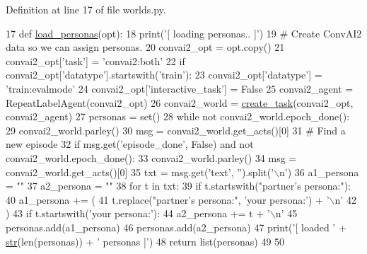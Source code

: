 Definition at line 17 of file worlds.\+py.


\begin{DoxyCode}
17 \textcolor{keyword}{def }\hyperlink{namespaceparlai_1_1tasks_1_1convai2_1_1worlds_a61a758b7cb43183397d002f7f203f586}{load\_personas}(opt):
18     print(\textcolor{stringliteral}{'[ loading personas.. ]'})
19     \textcolor{comment}{# Create ConvAI2 data so we can assign personas.}
20     convai2\_opt = opt.copy()
21     convai2\_opt[\textcolor{stringliteral}{'task'}] = \textcolor{stringliteral}{'convai2:both'}
22     \textcolor{keywordflow}{if} convai2\_opt[\textcolor{stringliteral}{'datatype'}].startswith(\textcolor{stringliteral}{'train'}):
23         convai2\_opt[\textcolor{stringliteral}{'datatype'}] = \textcolor{stringliteral}{'train:evalmode'}
24     convai2\_opt[\textcolor{stringliteral}{'interactive\_task'}] = \textcolor{keyword}{False}
25     convai2\_agent = RepeatLabelAgent(convai2\_opt)
26     convai2\_world = \hyperlink{namespaceparlai_1_1core_1_1worlds_a79969c7ba76d4b3c500f5bb776444dc6}{create\_task}(convai2\_opt, convai2\_agent)
27     personas = set()
28     \textcolor{keywordflow}{while} \textcolor{keywordflow}{not} convai2\_world.epoch\_done():
29         convai2\_world.parley()
30         msg = convai2\_world.get\_acts()[0]
31         \textcolor{comment}{# Find a new episode}
32         \textcolor{keywordflow}{if} msg.get(\textcolor{stringliteral}{'episode\_done'}, \textcolor{keyword}{False}) \textcolor{keywordflow}{and} \textcolor{keywordflow}{not} convai2\_world.epoch\_done():
33             convai2\_world.parley()
34             msg = convai2\_world.get\_acts()[0]
35             txt = msg.get(\textcolor{stringliteral}{'text'}, \textcolor{stringliteral}{''}).split(\textcolor{stringliteral}{'\(\backslash\)n'})
36             a1\_persona = \textcolor{stringliteral}{""}
37             a2\_persona = \textcolor{stringliteral}{""}
38             \textcolor{keywordflow}{for} t \textcolor{keywordflow}{in} txt:
39                 \textcolor{keywordflow}{if} t.startswith(\textcolor{stringliteral}{"partner's persona:"}):
40                     a1\_persona += (
41                         t.replace(\textcolor{stringliteral}{"partner's persona:"}, \textcolor{stringliteral}{'your persona:'}) + \textcolor{stringliteral}{'\(\backslash\)n'}
42                     )
43                 \textcolor{keywordflow}{if} t.startswith(\textcolor{stringliteral}{'your persona:'}):
44                     a2\_persona += t + \textcolor{stringliteral}{'\(\backslash\)n'}
45             personas.add(a1\_persona)
46             personas.add(a2\_persona)
47     print(\textcolor{stringliteral}{'[ loaded '} + \hyperlink{namespacegenerate__task__READMEs_a5b88452ffb87b78c8c85ececebafc09f}{str}(len(personas)) + \textcolor{stringliteral}{' personas ]'})
48     \textcolor{keywordflow}{return} list(personas)
49 
50 
\end{DoxyCode}
